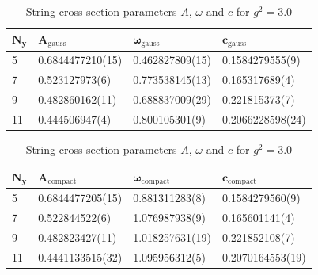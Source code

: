 \begin{table}[!hb]
\centering
\begin{tabular}{llll}
    $\mathbf{N_y}$ & $\mathbf{A_\mathrm{gauss}}$ & $\mathbf{\omega_\mathrm{gauss}}$ & $\mathbf{c_\mathrm{gauss}}$ \\ \hline
   5 & 0.6844477210(15) & 0.462827809(15) & 0.1584279555(9) \\
   7 & 0.523127973(6) & 0.773538145(13) & 0.165317689(4) \\
   9 & 0.482860162(11) & 0.688837009(29) & 0.221815373(7) \\
   11 & 0.444506947(4) & 0.800105301(9) & 0.2066228598(24) \\
\end{tabular}
\begin{tabular}{llll}
    $\mathbf{N_y}$ & $\mathbf{A_\mathrm{compact}}$ & $\mathbf{\omega_\mathrm{compact}}$ & $\mathbf{c_\mathrm{compact}}$ \\ \hline
   5 & 0.6844477205(15) & 0.881311283(8) & 0.1584279560(9) \\
   7 & 0.522844522(6) & 1.076987938(9) & 0.165601141(4) \\
   9 & 0.482823427(11) & 1.018257631(19) & 0.221852108(7) \\
   11 & 0.4441133515(32) & 1.095956312(5) & 0.2070164553(19) \\
\end{tabular}
\caption{String cross section parameters $A$, $\omega$ and $c$ for $g^2=3.0$}
\end{table}

